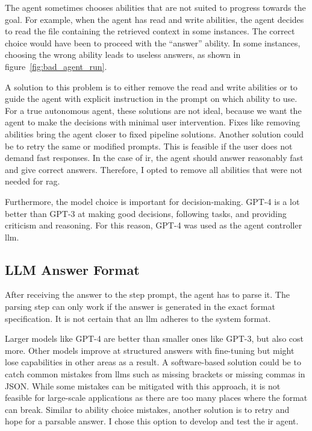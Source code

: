 \documentclass[../main.tex]{subfiles}
\begin{document}
The agent sometimes chooses abilities that are not suited to progress towards the goal.
For example, when the agent has read and write abilities, the agent decides to
read the file containing the retrieved context in some instances.
The correct choice would have been to proceed with the ``answer'' ability.
In some instances, choosing the wrong ability leads to useless answers,
as shown in figure~\ref{fig:bad_agent_run}.

A solution to this problem is to either remove the read and write abilities
or to guide the agent with explicit instruction in the prompt on which ability to use.
For a true autonomous agent, these solutions are not ideal, because we want the
agent to make the decisions with minimal user intervention.
Fixes like removing abilities bring the agent closer to fixed pipeline solutions.
Another solution could be to retry the same or modified prompts.
This is feasible if the user does not demand fast responses.
In the case of \gls{ir}, the agent should answer reasonably fast and
give correct answers.
Therefore, I opted to remove all abilities that were not needed for \gls{rag}.

Furthermore, the model choice is important for decision-making.
GPT-4 is a lot better than GPT-3 at making good decisions, following tasks, and providing
criticism and reasoning.
For this reason, GPT-4 was used as the agent controller \gls{llm}.

\subsection{LLM Answer Format}

After receiving the answer to the step prompt, the agent has to parse it.
The parsing step can only work if the answer is generated in the exact format specification.
It is not certain that an \gls{llm} adheres to the system format.

Larger models like GPT-4 are better than smaller ones like GPT-3, but also cost more.
Other models improve at structured answers with fine-tuning
but might lose capabilities in other areas as a result.
A software-based solution could be to catch common mistakes from \glspl{llm}
such as missing brackets or missing commas in JSON.
While some mistakes can be mitigated with this approach, it is not feasible
for large-scale applications as there are too many places where the format can break.
Similar to ability choice mistakes, another solution is to retry
and hope for a parsable answer.
I chose this option to develop and test the \gls{ir} agent.
\end{document}

